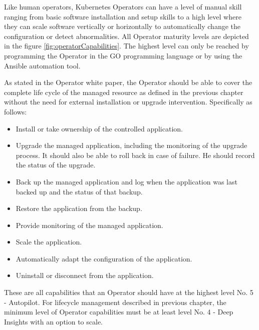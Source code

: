 
Like human operators, Kubernetes Operators can have a level of manual skill ranging from basic software installation and setup skills to a high level where they can scale software vertically or horizontally to automatically change the configuration or detect abnormalities. All Operator maturity levels are depicted in the figure \ref{fig:operatorCapabilities}. The highest level can only be reached by programming the Operator in the GO programming language or by using the Ansible automation tool. \cite{OperatorsOframework}


As stated in the Operator white paper, \cite{OperatorWhitepaper} the Operator should be able to cover the complete life cycle of the managed resource as defined in the previous chapter without the need for external installation or upgrade intervention. Specifically as follows:
\begin{itemize}
    \item Install or take ownership of the controlled application.
    \item Upgrade the managed application, including the monitoring of the upgrade process. It should also be able to roll back in case of failure. He should record the status of the upgrade.
    \item Back up the managed application and log when the application was last backed up and the status of that backup.
    \item Restore the application from the backup.
    \item Provide monitoring of the managed application.
    \item Scale the application.
    \item Automatically adapt the configuration of the application.
    \item Uninstall or disconnect from the application.
\end{itemize}

These are all capabilities that an Operator should have at the highest level No. 5 - Autopilot. For lifecycle management described in previous chapter, the minimum level of Operator capabilities must be at least level No. 4 - Deep Insights with an option to scale.

